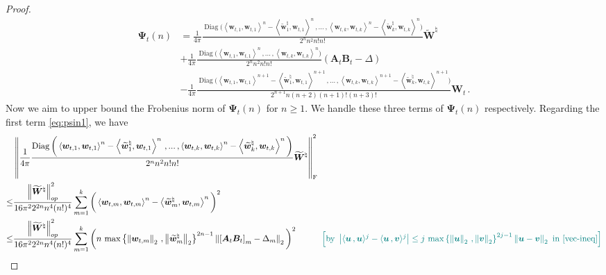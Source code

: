 \begin{proof}
\begin{align}
    \bm \Psi_t(n) & = \frac{1}{4\pi} \frac{\operatorname{Diag}\bigg(\left\langle{\bm w}_{t,1},{\bm w}_{t,1}\right\rangle^{n}-\left\langle\widetilde{\bm w}^\natural_1,{\bm w}_{t,1}\right\rangle^{n}\,,...\,,\left\langle{\bm w}_{t,k},{\bm w}_{t,k}\right\rangle^{n}-\left\langle\widetilde{\bm w}^\natural_k,{\bm w}_{t,k}\right\rangle^{n}\bigg)}{2^{n} n^2 n! n!}  \widetilde{\bm W}^\natural \label{eq:psin1} \\
    &+\frac{1}{4\pi} \frac{\operatorname{Diag}\bigg(\left\langle{\bm w}_{t,1},{\bm w}_{t,1}\right\rangle^n\,,...\,,\left\langle{\bm w}_{t,k},{\bm w}_{t,k}\right\rangle^n\bigg)}{2^{n} n^2 n! n!}\left(\bm A_t \bm B_t - \Delta\right) \label{eq:psin2} \\
    &-\frac{1}{4\pi}\frac{\operatorname{Diag}\bigg(\left\langle{\bm w}_{t,1},{\bm w}_{t,1}\right\rangle^{n+1}-\left\langle\widetilde{\bm w}^\natural_1,{\bm w}_{t,1}\right\rangle^{n+1}\,,...\,,\left\langle{\bm w}_{t,k},{\bm w}_{t,k}\right\rangle^{n+1}-\left\langle\widetilde{\bm w}^\natural_k,{\bm w}_{t,k}\right\rangle^{n+1}\bigg)}{2^{n+1} n(n + 2)(n+1)!(n+3)!}{\bm W}_{t}\,. \label{eq:psin3}
\end{align}
Now we aim to upper bound the Frobenius norm of $\bm \Psi_t(n)$ for $n\geq 1$. 
We handle these three terms of $\bm \Psi_t(n)$ respectively.
Regarding the first term \eqref{eq:psin1}, we have
\begin{align*}
    &\left\|\frac{1}{4\pi} \frac{\operatorname{Diag}\bigg(\left\langle{\bm w}_{t,1},{\bm w}_{t,1}\right\rangle^{n}-\left\langle\widetilde{\bm w}^\natural_1,{\bm w}_{t,1}\right\rangle^{n}\,,...\,,\left\langle{\bm w}_{t,k},{\bm w}_{t,k}\right\rangle^{n}-\left\langle\widetilde{\bm w}^\natural_k,{\bm w}_{t,k}\right\rangle^{n}\bigg)}{2^{n} n^2 n! n!}  \widetilde{\bm W}^\natural\right\|^2_{\rm F}\\
    \leq & \frac{\left\|\widetilde{\bm W}^\natural\right\|^2_{op}}{16\pi^2 2^{2n} n^4 (n!)^4}\sum_{m=1}^k\bigg(\left\langle{\bm w}_{t,m},{\bm w}_{t,m}\right\rangle^{n}-\left\langle\widetilde{\bm w}^\natural_m,{\bm w}_{t,m}\right\rangle^{n}\bigg)^2\\
    \leq & \frac{\left\|\widetilde{\bm W}^\natural\right\|^2_{op}}{16\pi^2 2^{2n} n^4 (n!)^4}\sum_{m=1}^k\bigg(n\,\max\left\{\left\|{\bm w}_{t,m}\right\|_2\,,\left\|\widetilde{\bm w}^\natural_m\right\|_2\right\}^{2n-1}\left\|\left[\bm A_t \bm B_t\right]_{m}-\Delta_m\right\|_2\bigg)^2\quad \tag*{\color{teal}$\left[\text{by }\left|\langle \bm u\,, \bm u \rangle^j - \langle \bm u\,, \bm v \rangle^j\right| \leq j\,\max\left\{\left\|\bm u\right\|_2\,,\left\|\bm v\right\|_2\right\}^{2j-1} \left\|\bm u - \bm v\right\|_2\text{ in \cref{vec-ineq}}\right]$}\\

\end{align*}
\end{proof}
